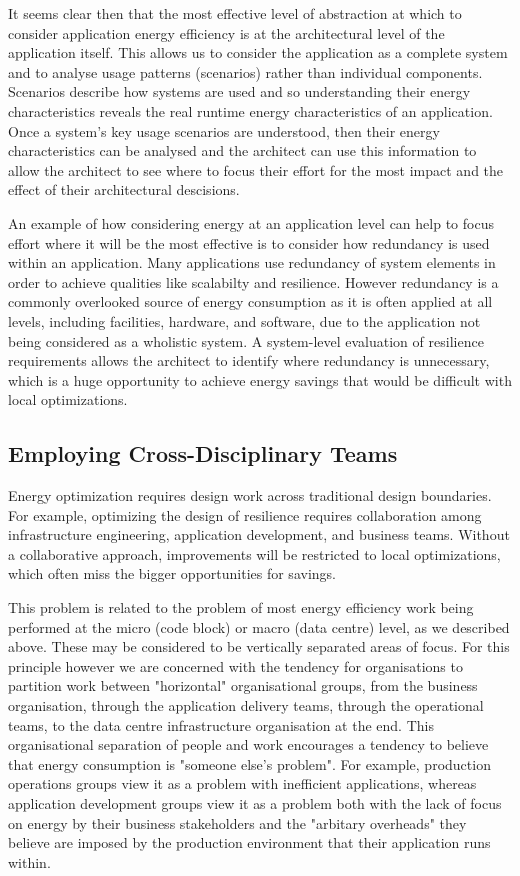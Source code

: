 It seems clear then that the most effective level of abstraction at which to consider application energy efficiency is at the architectural level of the application itself.  This allows us to consider the application as a complete system and to analyse usage patterns (scenarios) rather than individual components.  Scenarios describe how systems are used and so understanding their energy characteristics reveals the real runtime energy characteristics of an application.  Once a system's key usage scenarios are understood, then their energy characteristics can be analysed and the architect can use this information to allow the architect to see where to focus their effort for the most impact and the effect of their architectural descisions.

An example of how considering energy at an application level can help to focus effort where it will be the most effective is to consider how redundancy is used within an application.  Many applications use redundancy of system elements in order to achieve qualities like scalabilty and resilience.  However redundancy is a commonly overlooked source of energy consumption as it is often applied at all levels, including facilities, hardware, and software, due to the application not being considered as a wholistic system.   A system-level evaluation of resilience requirements allows the architect to identify where redundancy is unnecessary, which is a huge opportunity to achieve energy savings that would be difficult with local optimizations.

\subsection{Employing Cross-Disciplinary Teams}

Energy optimization requires design work across traditional design boundaries. For example, optimizing the design of resilience requires collaboration among infrastructure engineering, application development, and business teams. Without a collaborative approach, improvements will be restricted to local optimizations, which often miss the bigger opportunities for savings.

This problem is related to the problem of most energy efficiency work being performed at the micro (code block) or macro (data centre) level, as we described above.  These may be considered to be vertically separated areas of focus.  For this principle however we are concerned with the tendency for organisations to partition work between "horizontal" organisational groups, from the business organisation, through the application delivery teams, through the operational teams, to the data centre infrastructure organisation at the end.  This organisational separation of people and work encourages a tendency to believe that energy consumption is "someone else's problem".  For example, production operations groups view it as a problem with inefficient applications, whereas application development groups view it as a problem both with the lack of focus on energy by their business stakeholders and the "arbitary overheads" they believe are imposed by the production environment that their application runs within.

